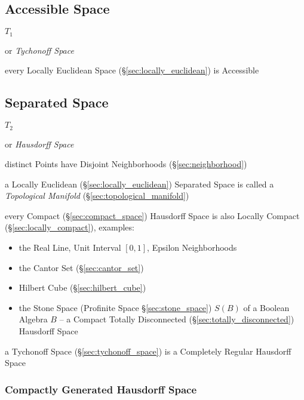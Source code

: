 \subsection{Accessible Space}\label{sec:accessible_space}

$\xspace{T}_1$

or \emph{Tychonoff Space}

every Locally Euclidean Space (\S\ref{sec:locally_euclidean}) is Accessible



\subsection{Separated Space}\label{sec:separated_space}

$\xspace{T}_2$

or \emph{Hausdorff Space}

distinct Points have Disjoint Neighborhoods (\S\ref{sec:neighborhood})

a Locally Euclidean (\S\ref{sec:locally_euclidean}) Separated Space is called a
\emph{Topological Manifold} (\S\ref{sec:topological_manifold})

every Compact (\S\ref{sec:compact_space}) Hausdorff Space is also Locally
Compact (\S\ref{sec:locally_compact}), examples:
\begin{itemize}
  \item the Real Line, Unit Interval $[0,1]$, Epsilon Neighborhoods
  \item the Cantor Set (\S\ref{sec:cantor_set})
  \item Hilbert Cube (\S\ref{sec:hilbert_cube})
  \item the Stone Space (Profinite Space \S\ref{sec:stone_space})
    $\xspace{S}(B)$ of a Boolean Algebra $B$ -- a Compact Totally Disconnected
    (\S\ref{sec:totally_disconnected}) Hausdorff Space
\end{itemize}

a Tychonoff Space (\S\ref{sec:tychonoff_space}) is a Completely Regular
Hausdorff Space



\subsubsection{Compactly Generated Hausdorff Space}
\label{sec:compact_hausdorff}



